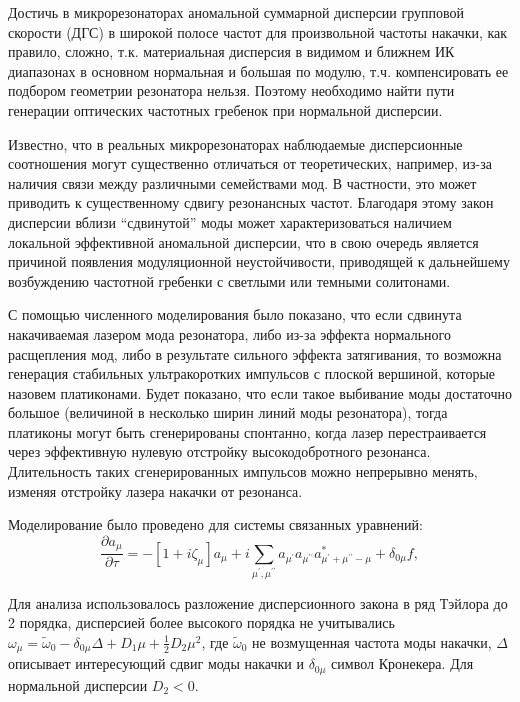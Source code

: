 Достичь в микрорезонаторах аномальной суммарной дисперсии групповой скорости (ДГС) в широкой полосе частот для произвольной частоты накачки, как правило, сложно, т.к. материальная дисперсия в видимом и ближнем ИК диапазонах в основном нормальная и большая по модулю, т.ч. компенсировать ее подбором геометрии резонатора нельзя. Поэтому необходимо найти пути генерации оптических частотных гребенок при нормальной дисперсии.

Известно, что в реальных микрорезонаторах наблюдаемые дисперсионные соотношения могут существенно отличаться от теоретических, например, из-за наличия связи между различными семействами мод. В частности, это может приводить к существенному сдвигу резонансных частот. Благодаря этому закон дисперсии вблизи “сдвинутой” моды может характеризоваться наличием локальной эффективной аномальной дисперсии, что в свою очередь является причиной появления модуляционной неустойчивости, приводящей к дальнейшему возбуждению частотной гребенки с светлыми или темными солитонами.

С помощью численного моделирования было показано, что если сдвинута накачиваемая лазером мода резонатора, либо из-за эффекта нормального расщепления мод, либо в результате сильного эффекта затягивания, то возможна генерация стабильных ультракоротких импульсов с плоской вершиной, которые назовем платиконами. Будет показано, что если такое выбивание моды достаточно большое (величиной в несколько ширин линий моды резонатора), тогда платиконы могут быть сгенерированы спонтанно, когда лазер перестраивается через эффективную нулевую отстройку высокодобротного резонанса. Длительность таких сгенерированных импульсов можно непрерывно менять, изменяя отстройку лазера накачки от резонанса.

Моделирование было проведено для системы связанных уравнений:
%
\begin{equation}
\frac{\partial a_\mu}{\partial \tau}=-[1+i\zeta_{\mu}]a_\mu+i\sum_{\mu^\prime,\mu^{\prime\prime}} a_{\mu^\prime}a_{\mu^{\prime\prime}}a_{\mu^\prime+\mu^{\prime\prime}-\mu}^*+\delta_{0\mu}f,
\end{equation}

Для анализа использовалось разложение дисперсионного закона в ряд Тэйлора до 2 порядка, дисперсией более высокого порядка не учитывались $\omega_\mu=\tilde\omega_0-\delta_{0\mu}\Delta+D_1\mu+\frac{1}{2}D_2\mu^2$,  где $\tilde\omega_0$ не возмущенная частота моды накачки, $\Delta$ описывает интересующий сдвиг моды накачки и $\delta_{0\mu}$ символ Кронекера. Для нормальной дисперсии $D_2<0$.

